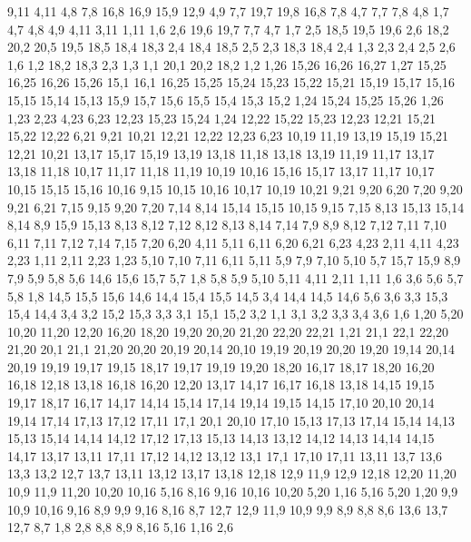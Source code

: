 9,11
4,11
%
4,8
7,8
16,8
16,9
15,9
12,9
4,9
%
7,7
19,7
19,8
16,8
7,8
%
4,7
7,7
7,8
4,8
%
1,7
4,7
4,8
4,9
4,11
3,11
1,11
%
1,6
2,6
19,6
19,7
7,7
4,7
1,7
%
2,5
18,5
19,5
19,6
2,6
%
18,2
20,2
20,5
19,5
18,5
18,4
18,3
%
2,4
18,4
18,5
2,5
%
2,3
18,3
18,4
2,4
%
1,3
2,3
2,4
2,5
2,6
1,6
%
1,2
18,2
18,3
2,3
1,3
%
1,1
20,1
20,2
18,2
1,2
1,26
15,26
16,26
16,27
1,27
%
15,25
16,25
16,26
15,26
%
15,1
16,1
16,25
15,25
15,24
15,23
15,22
15,21
15,19
15,17
15,16
15,15
15,14
15,13
15,9
15,7
15,6
15,5
15,4
15,3
15,2
%
1,24
15,24
15,25
15,26
1,26
%
1,23
2,23
4,23
6,23
12,23
15,23
15,24
1,24
%
12,22
15,22
15,23
12,23
%
12,21
15,21
15,22
12,22
%
6,21
9,21
10,21
12,21
12,22
12,23
6,23
%
10,19
11,19
13,19
15,19
15,21
12,21
10,21
%
13,17
15,17
15,19
13,19
13,18
%
11,18
13,18
13,19
11,19
%
11,17
13,17
13,18
11,18
%
10,17
11,17
11,18
11,19
10,19
%
10,16
15,16
15,17
13,17
11,17
10,17
%
10,15
15,15
15,16
10,16
%
9,15
10,15
10,16
10,17
10,19
10,21
9,21
9,20
%
6,20
7,20
9,20
9,21
6,21
%
7,15
9,15
9,20
7,20
%
7,14
8,14
15,14
15,15
10,15
9,15
7,15
%
8,13
15,13
15,14
8,14
%
8,9
15,9
15,13
8,13
8,12
%
7,12
8,12
8,13
8,14
7,14
%
7,9
8,9
8,12
7,12
7,11
7,10
%
6,11
7,11
7,12
7,14
7,15
7,20
6,20
%
4,11
5,11
6,11
6,20
6,21
6,23
4,23
%
2,11
4,11
4,23
2,23
%
1,11
2,11
2,23
1,23
%
5,10
7,10
7,11
6,11
5,11
%
5,9
7,9
7,10
5,10
%
5,7
15,7
15,9
8,9
7,9
5,9
5,8
%
5,6
14,6
15,6
15,7
5,7
%
1,8
5,8
5,9
5,10
5,11
4,11
2,11
1,11
%
1,6
3,6
5,6
5,7
5,8
1,8
%
14,5
15,5
15,6
14,6
%
14,4
15,4
15,5
14,5
%
3,4
14,4
14,5
14,6
5,6
3,6
%
3,3
15,3
15,4
14,4
3,4
%
3,2
15,2
15,3
3,3
%
3,1
15,1
15,2
3,2
%
1,1
3,1
3,2
3,3
3,4
3,6
1,6
1,20
5,20
10,20
11,20
12,20
16,20
18,20
19,20
20,20
21,20
22,20
22,21
1,21
%
21,1
22,1
22,20
21,20
%
20,1
21,1
21,20
20,20
20,19
20,14
20,10
%
19,19
20,19
20,20
19,20
%
19,14
20,14
20,19
19,19
19,17
19,15
%
18,17
19,17
19,19
19,20
18,20
%
16,17
18,17
18,20
16,20
16,18
%
12,18
13,18
16,18
16,20
12,20
%
13,17
14,17
16,17
16,18
13,18
%
14,15
19,15
19,17
18,17
16,17
14,17
%
14,14
15,14
17,14
19,14
19,15
14,15
%
17,10
20,10
20,14
19,14
17,14
17,13
17,12
17,11
%
17,1
20,1
20,10
17,10
%
15,13
17,13
17,14
15,14
%
14,13
15,13
15,14
14,14
%
14,12
17,12
17,13
15,13
14,13
%
13,12
14,12
14,13
14,14
14,15
14,17
13,17
%
13,11
17,11
17,12
14,12
13,12
%
13,1
17,1
17,10
17,11
13,11
13,7
13,6
13,3
13,2
%
12,7
13,7
13,11
13,12
13,17
13,18
12,18
12,9
%
11,9
12,9
12,18
12,20
11,20
%
10,9
11,9
11,20
10,20
10,16
%
5,16
8,16
9,16
10,16
10,20
5,20
%
1,16
5,16
5,20
1,20
%
9,9
10,9
10,16
9,16
%
8,9
9,9
9,16
8,16
%
8,7
12,7
12,9
11,9
10,9
9,9
8,9
8,8
%
8,6
13,6
13,7
12,7
8,7
%
1,8
2,8
8,8
8,9
8,16
5,16
1,16
%
2,6
